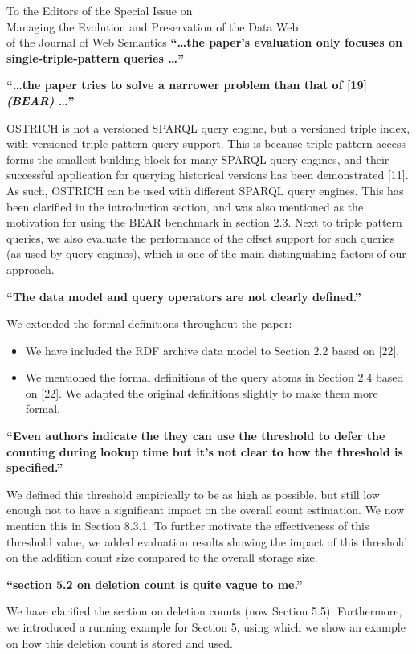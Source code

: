 \documentclass{letter}
\newcounter{section}
\begin{document}
\begin{letter}{To the Editors of the Special Issue on\\Managing the Evolution and Preservation of the Data Web\\of the Journal of Web Semantics}
\textbf{\enquote{\ldots the paper's evaluation only focuses on single-triple-pattern queries \ldots}}

\textbf{\enquote{\ldots the paper tries to solve a narrower problem than that of [19] \emph{(BEAR)} \ldots}}

OSTRICH is not a versioned SPARQL query engine, but a versioned triple index,
with versioned triple pattern query support.
This is because triple pattern access forms the smallest building block for many SPARQL query engines,
and their successful application for querying historical versions has been demonstrated [11].
As such, OSTRICH can be used with different SPARQL query engines.
This has been clarified in the introduction section, and was also mentioned as the motivation for using the BEAR benchmark in section 2.3.
Next to triple pattern queries,
we also evaluate the performance of the offset support for such queries
(as used by query engines),
which is one of the main distinguishing factors of our approach.

\textbf{\enquote{The data model and query operators are not clearly defined.}}

We extended the formal definitions throughout the paper:
\begin{itemize}
    \item We have included the RDF archive data model to Section 2.2 based on [22].
    \item We mentioned the formal definitions of the query atoms in Section 2.4 based on [22]. We adapted the original definitions slightly to make them more formal.
\end{itemize}

\textbf{\enquote{Even authors indicate the they can use the threshold to defer the counting during lookup time but it's not clear to how the threshold is specified.}}

We defined this threshold empirically to be as high as possible,
but still low enough not to have a significant impact on the overall count estimation.
We now mention this in Section 8.3.1.
To further motivate the effectiveness of this threshold value,
we added evaluation results showing the impact of this threshold on the addition count size compared to the overall storage size.

\textbf{\enquote{section 5.2 on deletion count is quite vague to me.}}

We have clarified the section on deletion counts (now Section 5.5).
Furthermore, we introduced a running example for Section 5,
using which we show an example on how this deletion count is stored and used.


\end{letter}
\end{document}
